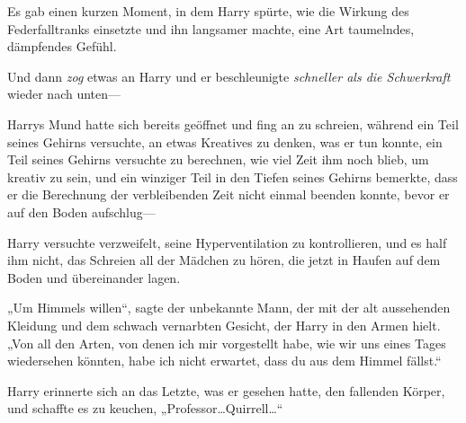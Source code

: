 Es gab einen kurzen Moment, in dem Harry spürte, wie die Wirkung des Federfalltranks einsetzte und ihn langsamer machte, eine Art taumelndes, dämpfendes Gefühl.

Und dann \emph{zog} etwas an Harry und er beschleunigte \emph{schneller als die Schwerkraft} wieder nach unten—

Harrys Mund hatte sich bereits geöffnet und fing an zu schreien, während ein Teil seines Gehirns versuchte, an etwas Kreatives zu denken, was er tun konnte, ein Teil seines Gehirns versuchte zu berechnen, wie viel Zeit ihm noch blieb, um kreativ zu sein, und ein winziger Teil in den Tiefen seines Gehirns bemerkte, dass er die Berechnung der verbleibenden Zeit nicht einmal beenden konnte, bevor er auf den Boden aufschlug—

\later

Harry versuchte verzweifelt, seine Hyperventilation zu kontrollieren, und es half ihm nicht, das Schreien all der Mädchen zu hören, die jetzt in Haufen auf dem Boden und übereinander lagen.

„Um Himmels willen“, sagte der unbekannte Mann, der mit der alt aussehenden Kleidung und dem schwach vernarbten Gesicht, der Harry in den Armen hielt. „Von all den Arten, von denen ich mir vorgestellt habe, wie wir uns eines Tages wiedersehen könnten, habe ich nicht erwartet, dass du aus dem Himmel fällst.“

Harry erinnerte sich an das Letzte, was er gesehen hatte, den fallenden Körper, und schaffte es zu keuchen, „Professor…Quirrell…“

